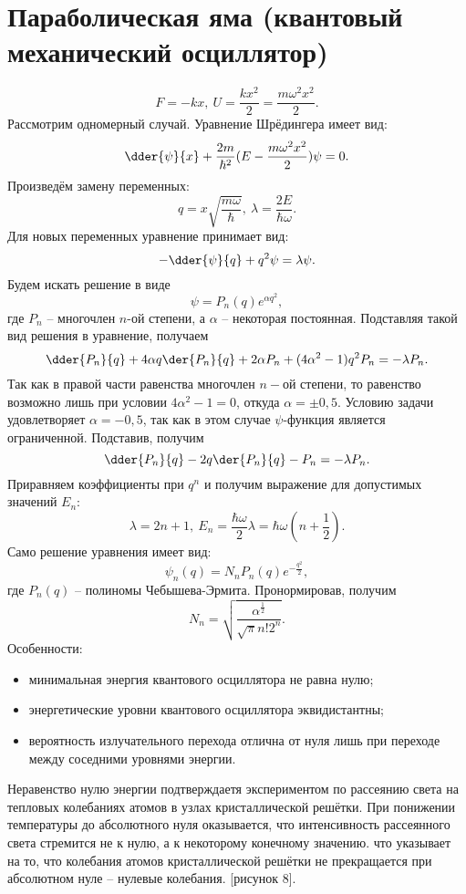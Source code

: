 \section{Параболическая яма (квантовый механический осциллятор)}
\[
    F = -kx,\ U = \frac{kx^2}{2} = \frac{m\omega^2x^2}{2}.
\]
Рассмотрим одномерный случай. Уравнение Шрёдингера имеет вид:
\[
    \dder{\psi}{x} + \frac{2m}{\hbar^2}(E - \frac{m\omega^2x^2}{2})\psi = 0.
\]
Произведём замену переменных:
\[
    q = x\sqrt{\frac{m\omega}{\hbar}},\ \lambda = \frac{2E}{\hbar\omega}.
\]
Для новых переменных уравнение принимает вид:
\[
    -\dder{\psi}{q} + q^2\psi = \lambda\psi.
\]
Будем искать решение в виде
\[
    \psi = P_n(q)e^{\alpha q^2},
\]
где \( P_n \) -- многочлен \( n \)-ой степени, а \( \alpha \) -- некоторая
постоянная. Подставляя такой вид решения в уравнение, получаем
\[
    \dder{P_n}{q} + 4\alpha q\der{P_n}{q} + 2\alpha P_n + (4\alpha^2 -1)q^2P_n =
    -\lambda P_n.
\]
Так как в правой части равенства многочлен \( n-\text{ой} \) степени, то
равенство возможно лишь при условии \( 4\alpha^2 - 1 = 0 \), откуда
\( \alpha = \pm0,5 \). Условию задачи удовлетворяет \( \alpha = -0,5 \), так как
в этом случае \( \psi \)-функция является ограниченной. Подставив, получим
\[
    \dder{P_n}{q} - 2q\der{P_n}{q} - P_n = -\lambda P_n.
\]
Приравняем коэффициенты при \( q^n \) и получим выражение для допустимых
значений \( E_n \):
\[
    \lambda = 2n+1,\ E_n = \frac{\hbar\omega}{2}\lambda =
    \hbar\omega\left(n+\frac{1}{2}\right).
\]
Само решение уравнения имеет вид:
\[
    \psi_n(q) = N_nP_n(q)e^{-\frac{q^2}{2}},
\]
где \( P_n(q) \) -- полиномы Чебышева-Эрмита. Пронормировав, получим
\[
    N_n = \sqrt{\frac{\alpha^\frac{1}{2}}{\sqrt{\pi}n!2^n}}.
\]
Особенности:
\begin{itemize}
    \item минимальная энергия квантового осциллятора не равна нулю;
    \item энергетические уровни квантового осциллятора эквидистантны;
    \item вероятность излучательного перехода отлична от нуля лишь при переходе
    между соседними уровнями энергии.
\end{itemize}

Неравенство нулю энергии подтверждаетя экспериментом по рассеянию света на
тепловых колебаниях атомов в узлах кристаллической решётки. При понижении
температуры до абсолютного нуля оказывается, что интенсивность рассеянного света
стремится не к нулю, а к некоторому конечному значению. что указывает на то, что
колебания атомов кристаллической решётки не прекращается при абсолютном нуле -- 
нулевые колебания.
[рисунок 8].

\newpage
